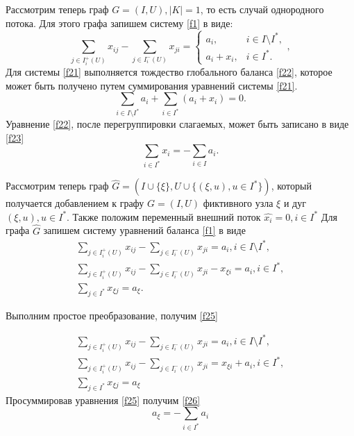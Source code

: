 \documentclass[14pt]{extarticle}%
\begin{document}
Рассмотрим теперь граф $G=(I,U), |K|=1$, то есть случай однородного потока. Для этого графа запишем систему \eqref{f1} в виде:
\begin{equation}\label{f21}
 \sum_{j\in I^+_i(U)} x_{ij}-\sum_{j\in I^-_i(U)}x_{ji}=\left\{\begin{matrix}
a_i, & i\in I\setminus I^*,\\ 
a_i+x_i, & i\in I^*.
\end{matrix}\right.,
\end{equation}
Для системы \eqref{f21} выполняется тождество глобального баланса \eqref{f22}, которое может быть получено путем суммирования уравнений системы \eqref{f21}.
\begin{equation}\label{f22}
\sum_{i\in I\setminus I^*} a_i +\sum_{i\in I^*} (a_i+x_i)=0.
\end{equation}
Уравнение \eqref{f22}, после перегруппировки слагаемых, может быть записано в виде \eqref{f23}
\begin{equation}\label{f23}
\sum_{i\in I^*}x_i=-\sum_{i\in I}a_i.
\end{equation}

Рассмотрим теперь граф $\widehat{G}=(I\cup\{\xi\}, U\cup\{(\xi,u),u\in I^*\})$, который получается добавлением к графу $G=(I,U)$ фиктивного узла $\xi$ и дуг $(\xi,u),u\in I^*$. Также положим переменный внешний поток $\widehat{x_i}=0, i\in I^*$  Для графа $\widehat{G}$ запишем систему уравнений баланса \eqref{f1} в виде
\begin{equation}\label{f24} \begin{gathered}
\sum_{j\in I^+_i(U)} x_{ij}-\sum_{j\in I^-_i(U)}x_{ji}=a_i,  i\in I\setminus I^*, \\
\sum_{j\in I^+_i(U)} x_{ij}-\sum_{j\in I^-_i(U)}x_{ji} -x_{\xi i}=a_i,  i\in I^*,\\
\sum_{j\in I^*} x_{\xi j}=a_\xi.
\end{gathered}
\end{equation}


Выполним простое преобразование, получим \eqref{f25}

\begin{equation}\label{f25} 
\begin{gathered}
\sum_{j\in I^+_i(U)} x_{ij}-\sum_{j\in I^-_i(U)}x_{ji}=a_i, i\in I\setminus I^*,\\
\sum_{j\in I^+_i(U)} x_{ij}-\sum_{j\in I^-_i(U)}x_{ji} =x_{\xi i}+a_i, i\in I^*,\\
\sum_{j\in I^*} x_{\xi j}=a_\xi 
\end{gathered}
\end{equation}
Просуммировав уравнения \eqref{f25} получим \eqref{f26}
\begin{equation}\label{f26}
a_{\xi}=-\sum_{i \in I^*} a_i
\end{equation}
\end{document}

